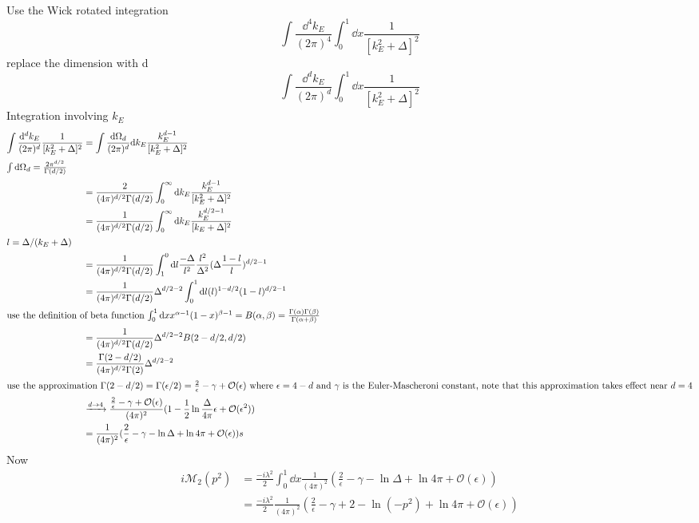 \documentclass{article}
\newcommand{\g}{\gamma}
\renewcommand{\a}{\alpha}
\renewcommand{\b}{\beta}
\renewcommand{\G}{\Gamma}
\begin{document}
\begin{enumerate}[(i)]
  Use the Wick rotated integration
  $$\int\frac{\dd^4k_E}{(2\pi)^4}\int^1_0\dd x\frac{1}{[k_E^2+\Delta]^2}$$
  replace the dimension with d
  $$\int\frac{\dd^dk_E}{(2\pi)^d}\int^1_0\dd x\frac{1}{[k_E^2+\Delta]^2}$$
  Integration involving $k_E$
  \begin{align*}
    \int\frac{\dd^dk_E}{(2\pi)^d}\frac{1}{[k_E^2+\Delta]^2}&=\int\frac{\dd\Omega_d}{(2\pi)^d}\dd k_E\frac{k_E^{d-1}}{[k_E^2+\Delta]^2}\\\intertext{$\int\dd\Omega_d=\frac{2\pi^{d/2}}{\Gamma(d/2)}$}
    &=\frac{2}{(4\pi)^{d/2}\Gamma(d/2)}\int_0^{\infty}\dd k_E\frac{k_E^{d-1}}{[k_E^2+\Delta]^2}\\
    &=\frac{1}{(4\pi)^{d/2}\Gamma(d/2)}\int_0^{\infty}\dd k_E\frac{k_E^{d/2-1}}{[k_E+\Delta]^2}\\\intertext{$l=\Delta/(k_E+\Delta)$}
    &=\frac{1}{(4\pi)^{d/2}\Gamma(d/2)}\int_{1}^{0}\dd l\frac{-\Delta}{l^2}\frac{l^2}{\Delta^2}(\Delta\frac{1-l}{l})^{d/2-1}\\
    &=\frac{1}{(4\pi)^{d/2}\Gamma(d/2)}\Delta^{d/2-2}\int_0^{1}\dd l(l)^{1-d/2}(1-l)^{d/2-1}\\\intertext{use the definition of beta function $\int_0^1\dd xx^{\alpha-1}(1-x)^{\beta-1}=B(\a,\b)=\frac{\Gamma(\a)\Gamma(\b)}{\G(\a+\b)}$}
    &=\frac{1}{(4\pi)^{d/2}\Gamma(d/2)}\Delta^{d/2-2}B(2-d/2,d/2)\\
    &=\frac{\G(2-d/2)}{(4\pi)^{d/2}\G(2)}\Delta^{d/2-2}\\\intertext{use the approximation $\G(2-d/2)=\G(\epsilon/2)=\frac{2}{\epsilon}-\g+\mathcal{O}(\epsilon)$ where $\epsilon=4-d$ and $\g$ is the Euler-Mascheroni constant, note that this approximation takes effect near $d=4$}
    &\xrightarrow{d\rightarrow4}\frac{\frac{2}{\epsilon}-\g+\mathcal{O}(\epsilon)}{(4\pi)^{2}}(1-\frac{1}{2}\ln{\frac{\Delta}{4\pi}}\epsilon+\mathcal{O}(\epsilon^2))\\
    &=\frac{1}{(4\pi)^{2}}(\frac{2}{\epsilon}-\g-\ln{\Delta}+\ln{4\pi}+\mathcal{O}(\epsilon))s
  \end{align*}
  Now
  \begin{align*}
    i\mathcal{M}_2(p^2)&=\frac{-i\lambda^2}{2}\int_0^1\dd x\frac{1}{(4\pi)^{2}}(\frac{2}{\epsilon}-\g-\ln{\Delta}+\ln{4\pi}+\mathcal{O}(\epsilon))\\
    &=\frac{-i\lambda^2}{2}\frac{1}{(4\pi)^{2}}(\frac{2}{\epsilon}-\g+2-\ln{(-p^2)}+\ln{4\pi}+\mathcal{O}(\epsilon))
  \end{align*}

\end{enumerate}
\end{document}
